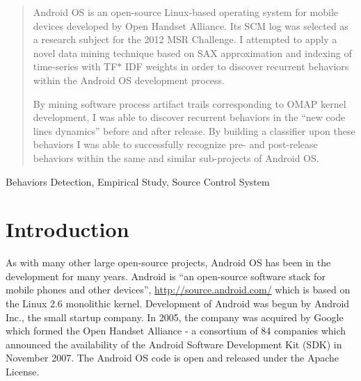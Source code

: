 \documentclass[10pt, conference, compsocconf]{IEEEtran}
\begin{document}




\maketitle


\begin{abstract}
Android OS is an open-source Linux-based operating system for mobile devices developed by 
Open Handset Alliance. Its SCM log was selected as a research subject for 
the 2012 MSR Challenge.
I attempted to apply a novel data mining technique based on SAX approximation and indexing 
of time-series with TF$\ast$ IDF weights in order to discover recurrent behaviors within 
the Android OS development process. 

By mining software process artifact trails corresponding to OMAP kernel development, 
I was able to discover recurrent behaviors in the ``new code lines dynamics'' before and after
release. By building a classifier upon these behaviors I was able to successfully recognize 
pre- and post-release behaviors within the same and similar sub-projects of Android OS.
\end{abstract}

\begin{IEEEkeywords}
Behaviors Detection, Empirical Study, Source Control System

\end{IEEEkeywords}


%
\IEEEpeerreviewmaketitle



\section{Introduction}
As with many other large open-source projects, Android OS has been in the development for many years. 
Android is ``an open-source software stack for mobile phones and other devices'',
\url{http://source.android.com/} which is based on the Linux 2.6 monolithic kernel.
Development of Android was begun by Android Inc., the small startup company.
In 2005, the company was acquired by Google which formed the Open Handset Alliance - a consortium of 84 companies 
which announced the availability of the Android Software Development Kit (SDK) 
in November 2007. The Android OS code is open and released under the Apache License.
\end{document}
